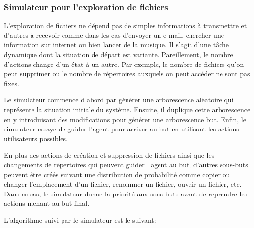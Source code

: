 \subsubsection*{Simulateur pour l'exploration de fichiers}
L'exploration de fichiers ne dépend pas de simples informations à transmettre et d'autres à recevoir comme dans les cas d'envoyer un e-mail, chercher une information sur internet ou bien lancer de la musique. Il s'agit d'une tâche dynamique dont la situation de départ est variante. Pareillement, le nombre d'actions change d'un état à un autre. Par exemple, le nombre de fichiers qu'on peut supprimer ou le nombre de répertoires auxquels on peut accéder ne sont pas fixes.
\par Le simulateur commence d'abord par générer une arborescence aléatoire qui représente la situation initiale du système. Ensuite, il duplique cette arborescence en y introduisant des modifications pour générer une arborescence but. Enfin, le simulateur essaye de guider l'agent pour arriver au but en utilisant les actions utilisateurs possibles.
\par En plus des actions de création et suppression de fichiers ainsi que les changements de répertoires qui peuvent guider l'agent au but, d'autres sous-buts peuvent être créés suivant une distribution de probabilité comme copier ou changer l'emplacement d'un fichier, renommer un fichier, ouvrir un fichier, etc. Dans ce cas, le simulateur donne la priorité aux sous-buts avant de reprendre les actions menant au but final.
\par L'algorithme suivi par le simulateur est le suivant:
\makeatletter
\def\BState{\State\hskip-\ALG@thistlm}
\makeatother

